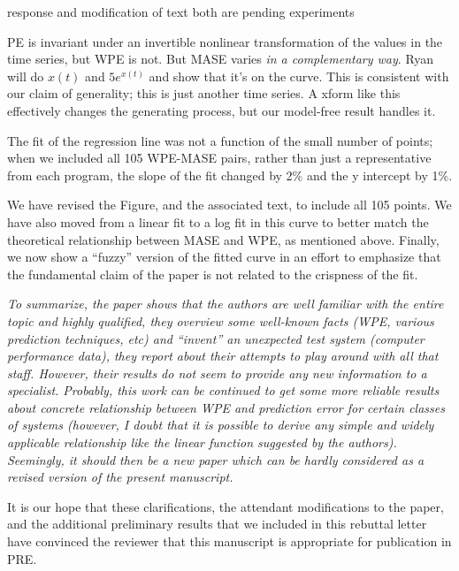 \documentclass[12pt]{article}
\newcommand{\alert}[1]{{\color{red}#1}}
\begin{document}
\alert{response and modification of text both are pending experiments}

PE is invariant under an invertible nonlinear transformation of the
values in the time series, but WPE is not.  But MASE varies \emph{in a
  complementary way}.  Ryan will do $x(t)$ and $5e^{x(t)}$ and show
that it's on the curve.  This is consistent with our claim of
generality; this is just another time series.  A xform like this
effectively changes the generating process, but our model-free result
handles it.

The fit of the regression line was not a function of the small number
of points; when we included all 105 WPE-MASE pairs, rather than just a
representative from each program, the slope of the fit changed by 2\%
and the y intercept by 1\%.

We have revised the Figure, and the associated text, to include all
105 points.  We have also moved from a linear fit to a log fit in this
curve to better match the theoretical relationship between MASE and
WPE, as mentioned above.  Finally, we now show a ``fuzzy'' version of
the fitted curve in an effort to emphasize that the fundamental claim
of the paper is not related to the crispness of the fit.

\emph{To summarize, the paper shows that the authors are well familiar
  with the entire topic and highly qualified, they overview some
  well-known facts (WPE, various prediction techniques, etc) and
  ``invent'' an unexpected test system (computer performance data),
  they report about their attempts to play around with all that
  staff. However, their results do not seem to provide any new
  information to a specialist. Probably, this work can be continued to
  get some more reliable results about concrete relationship between
  WPE and prediction error for certain classes of systems (however, I
  doubt that it is possible to derive any simple and widely applicable
  relationship like the linear function suggested by the
  authors). Seemingly, it should then be a new paper which can be
  hardly considered as a revised version of the present manuscript.}

It is our hope that these clarifications, the attendant modifications
to the paper, and the additional preliminary results that we included
in this rebuttal letter have convinced the reviewer that this
manuscript is appropriate for publication in PRE.
\end{document}
